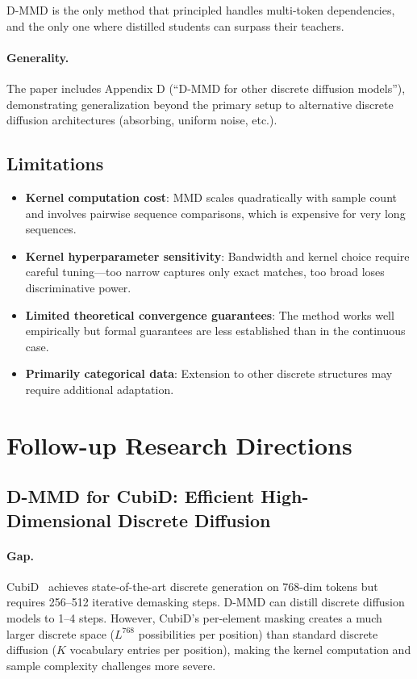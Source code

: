 \documentclass[11pt]{article}
\begin{document}
D-MMD is the only method that principled handles multi-token dependencies, and the only one where distilled students can surpass their teachers.

\paragraph{Generality.}
The paper includes Appendix D (``D-MMD for other discrete diffusion models''), demonstrating generalization beyond the primary setup to alternative discrete diffusion architectures (absorbing, uniform noise, etc.).

\subsection{Limitations}
\begin{itemize}
    \item \textbf{Kernel computation cost}: MMD scales quadratically with sample count and involves pairwise sequence comparisons, which is expensive for very long sequences.
    \item \textbf{Kernel hyperparameter sensitivity}: Bandwidth and kernel choice require careful tuning---too narrow captures only exact matches, too broad loses discriminative power.
    \item \textbf{Limited theoretical convergence guarantees}: The method works well empirically but formal guarantees are less established than in the continuous case.
    \item \textbf{Primarily categorical data}: Extension to other discrete structures may require additional adaptation.
\end{itemize}

\section{Follow-up Research Directions}

\subsection{D-MMD for CubiD: Efficient High-Dimensional Discrete Diffusion}

\paragraph{Gap.}
CubiD~\cite{cubid} achieves state-of-the-art discrete generation on 768-dim tokens but requires 256--512 iterative demasking steps.
D-MMD can distill discrete diffusion models to 1--4 steps.
However, CubiD's per-element masking creates a much larger discrete space ($L^{768}$ possibilities per position) than standard discrete diffusion ($K$ vocabulary entries per position), making the kernel computation and sample complexity challenges more severe.
\end{document}
